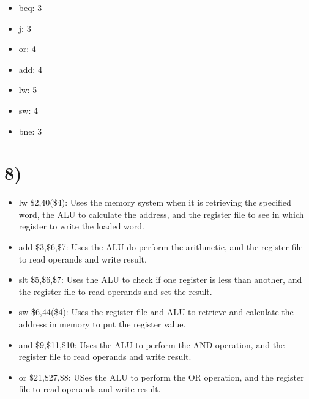 \documentclass[a4paper,11pt]{article}
\begin{document}
\begin{itemize}
  \item beq: 3
  \item j: 3
  \item or: 4
  \item add: 4 
  \item lw: 5
  \item sw: 4
  \item bne: 3
\end{itemize}



\section*{8)}
\begin{itemize}
  \item lw \$2,40(\$4):  Uses the memory system when it is retrieving the specified word, the ALU to calculate the address, and the register file to see in which register to write the loaded word.
  \item add \$3,\$6,\$7: Uses the ALU do perform the arithmetic, and the register file to read operands and write result.
  \item slt \$5,\$6,\$7:  Uses the ALU to check if one register is less than another, and the register file to read operands and set the result.
  \item sw \$6,44(\$4):  Uses the register file and ALU to retrieve and calculate the address in memory to put the register value.
  \item and \$9,\$11,\$10:  Uses the ALU to perform the AND operation, and the register file to read operands and write result.
  \item or \$21,\$27,\$8: USes the ALU to perform the OR operation, and the register file to read operands and write result.
\end{itemize}

\end{document}
